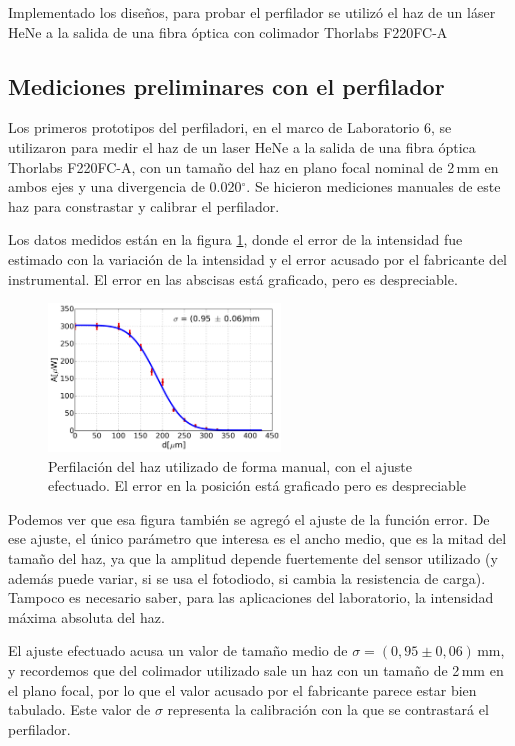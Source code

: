 Implementado los diseños, para probar el perfilador se utilizó el haz de un láser HeNe a la salida de una fibra óptica con colimador Thorlabs F220FC-A

\subsection{Mediciones preliminares con el perfilador}
Los primeros prototipos del perfiladori, en el marco de Laboratorio 6, se utilizaron para medir el haz de un laser HeNe a la salida de una fibra óptica Thorlabs F220FC-A\cite{thorlabs_fc}, con un tamaño del haz en plano focal nominal de 2$\,$mm en ambos ejes y una divergencia de 0.020$^\circ$. Se hicieron mediciones manuales de este haz para constrastar y calibrar el perfilador.

Los datos medidos están en la figura \ref{fig:perfilador/calibracion_preliminar}, donde el error de la intensidad fue estimado con la variación de la intensidad y el error acusado por el fabricante del instrumental. El error en las abscisas está graficado, pero es despreciable.

\begin{figure}[H]
    \centering
    \includegraphics[width=0.55\textwidth]{fig/perfilador/calibracion_preliminar}
    \caption{Perfilación del haz utilizado de forma manual, con el ajuste efectuado. El error en la posición está graficado pero es despreciable}
    \label{fig:perfilador/calibracion_preliminar}
\end{figure}

Podemos ver que esa figura también se agregó el ajuste de la función error. De ese ajuste, el único parámetro que interesa es el ancho medio, que es la mitad del tamaño del haz, ya que la amplitud depende fuertemente del sensor utilizado (y además puede variar, si se usa el fotodiodo, si cambia la resistencia de carga). Tampoco es necesario saber, para las aplicaciones del laboratorio, la intensidad máxima absoluta del haz.

El ajuste efectuado acusa un valor de tamaño medio de $\sigma = (0,95\pm0,06)\,$mm, y recordemos que del colimador utilizado sale un haz con un tamaño de 2$\,$mm en el plano focal, por lo que el valor acusado por el fabricante parece estar bien tabulado. Este valor de $\sigma$ representa la calibración con la que se contrastará el perfilador.

